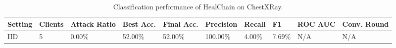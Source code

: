 \begin{table}[t]
\centering
\caption{Classification performance of HealChain on ChestXRay.}
\label{tab:accuracy}
\begin{tabular}{llllllllll}
\hline
Setting & Clients & Attack Ratio & Best Acc. & Final Acc. & Precision & Recall & F1 & ROC AUC & Conv. Round \\
\hline
IID & 5 & 0.00\% & 52.00\% & 52.00\% & 100.00\% & 4.00\% & 7.69\% & N/A & N/A \\
\hline
\end{tabular}
\end{table}
